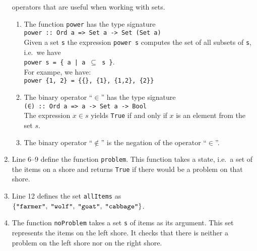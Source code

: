 \begin{enumerate}
            operators that are useful when working with sets.
            \begin{enumerate}
            \item The function \texttt{power} has the type signature
                  \\[0.2cm]
                  \hspace*{1.3cm}
                  \texttt{power :: Ord a => Set a -> Set (Set a)}
                  \\[0.2cm]
                  Given a set \texttt{s} the expression \texttt{power s} computes the set of all subsets of
                  \texttt{s}, i.e.~we have
                  \\[-0.2cm]
                  \hspace*{1.3cm}
                  \texttt{power s = \{ a \;|\; a $\subseteq$ s \}}.
                  \\[0.2cm]
                  For exampe, we have:
                  \\[0.2cm]
                  \hspace*{1.3cm}
                  \texttt{power \{1, 2\} = \{\{\}, \{1\}, \{1,2\}, \{2\}\}}
            \item The binary operator ``$\in$'' has the type signature
                  \\[0.2cm]
                  \hspace*{1.3cm}
                  \texttt{(∈) :: Ord a => a -> Set a -> Bool}
                  \\[0.2cm]
                  The expression $x \in s$ yields \texttt{True} if and only if $x$ is an element from the set $s$.
            \item The binary operator ``$\not\in$'' is the negation of the operator ``$\in$''.
            \end{enumerate}
      \item Line 6--9 define the function \texttt{problem}.  This function takes a state, i.e.~a set of the
            items on a shore and returns \texttt{True} if there would be a problem on that shore.
      \item Line 12 defines the set \texttt{allItems} as
            \\[0.2cm]
            \hspace*{1.3cm}
            $\{ \squote{farmer},\; \squote{wolf},\; \squote{goat},\; \squote{cabbage} \}$.
      \item The function \texttt{noProblem} takes a set \texttt{s} of items as its argument.  This set represents
            the items on the left shore.  It checks that there is neither a problem on the left shore nor on
            the right shore.


\end{enumerate}

